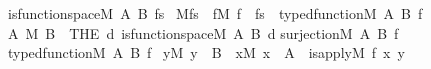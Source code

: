\begin{isabelle}%
is{\isacharunderscore}{\kern0pt}function{\isacharunderscore}{\kern0pt}space{\isacharparenleft}{\kern0pt}M{\isacharcomma}{\kern0pt}\ A{\isacharcomma}{\kern0pt}\ B{\isacharcomma}{\kern0pt}\ fs{\isacharparenright}{\kern0pt}\ {\isasymequiv}\isanewline
M{\isacharparenleft}{\kern0pt}fs{\isacharparenright}{\kern0pt}\ {\isasymand}\ {\isacharparenleft}{\kern0pt}{\isasymforall}f{\isacharbrackleft}{\kern0pt}M{\isacharbrackright}{\kern0pt}{\isachardot}{\kern0pt}\ f\ {\isasymin}\ fs\ {\isasymlongleftrightarrow}\ typed{\isacharunderscore}{\kern0pt}function{\isacharparenleft}{\kern0pt}M{\isacharcomma}{\kern0pt}\ A{\isacharcomma}{\kern0pt}\ B{\isacharcomma}{\kern0pt}\ f{\isacharparenright}{\kern0pt}{\isacharparenright}{\kern0pt}\isasep\isanewline\isanewline%
A\ {\isasymrightarrow}\isactrlbsup M\isactrlesup \ B\ {\isasymequiv}\ THE\ d{\isachardot}{\kern0pt}\ is{\isacharunderscore}{\kern0pt}function{\isacharunderscore}{\kern0pt}space{\isacharparenleft}{\kern0pt}M{\isacharcomma}{\kern0pt}\ A{\isacharcomma}{\kern0pt}\ B{\isacharcomma}{\kern0pt}\ d{\isacharparenright}{\kern0pt}\isasep\isanewline\isanewline%
surjection{\isacharparenleft}{\kern0pt}M{\isacharcomma}{\kern0pt}\ A{\isacharcomma}{\kern0pt}\ B{\isacharcomma}{\kern0pt}\ f{\isacharparenright}{\kern0pt}\ {\isasymequiv}\isanewline
typed{\isacharunderscore}{\kern0pt}function{\isacharparenleft}{\kern0pt}M{\isacharcomma}{\kern0pt}\ A{\isacharcomma}{\kern0pt}\ B{\isacharcomma}{\kern0pt}\ f{\isacharparenright}{\kern0pt}\ {\isasymand}\isanewline
{\isacharparenleft}{\kern0pt}{\isasymforall}y{\isacharbrackleft}{\kern0pt}M{\isacharbrackright}{\kern0pt}{\isachardot}{\kern0pt}\ y\ {\isasymin}\ B\ {\isasymlongrightarrow}\ {\isacharparenleft}{\kern0pt}{\isasymexists}x{\isacharbrackleft}{\kern0pt}M{\isacharbrackright}{\kern0pt}{\isachardot}{\kern0pt}\ x\ {\isasymin}\ A\ {\isasymand}\ is{\isacharunderscore}{\kern0pt}apply{\isacharparenleft}{\kern0pt}M{\isacharcomma}{\kern0pt}\ f{\isacharcomma}{\kern0pt}\ x{\isacharcomma}{\kern0pt}\ y{\isacharparenright}{\kern0pt}{\isacharparenright}{\kern0pt}{\isacharparenright}{\kern0pt}%
\end{isabelle}%

